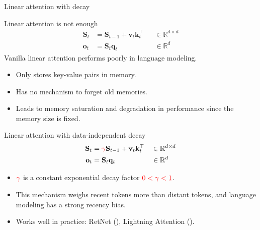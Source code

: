 
\begin{frame}{}
    \centering
    \LARGE
     Linear attention with decay
\end{frame} 



\begin{frame}{Linear attention is not enough}
    \begin{align*}
        \mathbf{S}_t &= \mathbf{S}_{t-1} + \mathbf{v}_t\mathbf{k}_t^\top &&\in \mathbb{R}^{d \times d}  \\
        \mathbf{o}_t &= \mathbf{S}_t\mathbf{q}_t &&\in \mathbb{R}^d  
    \end{align*}
    \vspace{3mm}
    Vanilla linear attention {\color{red}performs poorly in language modeling}.
    \begin{itemize}
        \item Only stores key-value pairs in memory.
        \item Has no mechanism to forget old memories.
        \item Leads to memory saturation and degradation in performance since the memory size is fixed.
    \end{itemize}
\end{frame}


\begin{frame}{Linear attention with data-independent decay}
    \begin{align*}
        \mathbf{S}_t &= {\color{red}\gamma} \mathbf{S}_{t-1} + \mathbf{v}_t\mathbf{k}_t^\top &&\in \mathbb{R}^{d \times d}  \\
        \mathbf{o}_t &= \mathbf{S}_t\mathbf{q}_t &&\in \mathbb{R}^d  
    \end{align*}
    \begin{itemize}
        \item ${\color{red}\gamma}$ is a constant exponential decay factor ${\color{red}0 < \gamma < 1}$.
        \item This mechanism {\color{red}weighs recent tokens more than distant tokens}, and language modeling has a strong {\color{red}recency bias}.
        \item Works well in practice: RetNet (\cite{sun2023retentive}), Lightning Attention (\cite{Qin2024VariousLC}).
    \end{itemize}
\end{frame}



